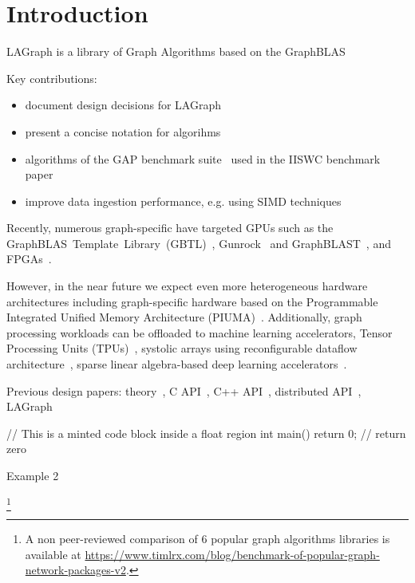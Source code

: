 \section{Introduction}
\label{sec:introduction}

LAGraph is a library of Graph Algorithms based on the GraphBLAS

Key contributions:

\begin{itemize}
    \item document design decisions for LAGraph
    \item present a concise notation for \grb algorihms
    \item algorithms of the GAP benchmark suite~\cite{DBLP:journals/corr/BeamerAP15} used in the IISWC benchmark paper~\cite{DBLP:conf/iiswc/AzadABBCDDDDFGG20}
    \item improve data ingestion performance, e.g. using SIMD techniques~\cite{DBLP:journals/vldb/LangdaleL19}
\end{itemize}

Recently, numerous graph-specific have targeted GPUs such as the \mbox{GraphBLAS Template Library (GBTL)}~\cite{7529957}, Gunrock~\cite{DBLP:journals/topc/WangPDWYWOYLRO17} and \mbox{GraphBLAST}~\cite{DBLP:journals/corr/abs-1908-01407}, and FPGAs~\cite{DBLP:journals/corr/abs-1903-06697}.

However, in the near future we expect even more heterogeneous hardware architectures including graph-specific hardware based on the Programmable Integrated Unified Memory Architecture (PIUMA)~\cite{DBLP:journals/corr/abs-2010-06277}.
Additionally, graph processing workloads can be offloaded to  machine learning accelerators, \eg
Tensor Processing Units (TPUs)~\cite{DBLP:conf/isca/JouppiYPPABBBBB17},
systolic arrays using reconfigurable dataflow architecture~\cite{SambaNova},
sparse linear algebra-based deep learning accelerators~\cite{Cerebras}.

Previous \grb design papers:
theory~\cite{DBLP:conf/hpec/MattsonBBBDFFGGHKLLPPRSWY13},
C API~\cite{DBLP:conf/hpec/MattsonYMBM17},
C++ API~\cite{DBLP:conf/ipps/BrockBMMM20},
distributed API~\cite{DBLP:conf/ipps/BrockBMMMPSS20},
LAGraph~\cite{DBLP:conf/ipps/MattsonDKBMMY19}

\begin{listing}[h]
\begin{cplus}
// This is a minted code block inside a float region
int main() {
    return 0; // return zero
}
\end{cplus}
\caption{Example 2}
\end{listing}



\footnote{A non peer-reviewed comparison of 6 popular graph algorithms libraries is available at
\url{https://www.timlrx.com/blog/benchmark-of-popular-graph-network-packages-v2}.}
